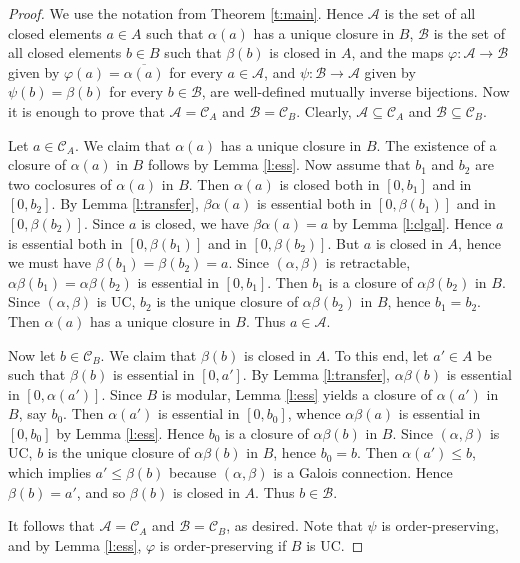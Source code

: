 \documentclass[11pt,a4paper]{amsart}
\begin{document}
\begin{proof} We use the notation from Theorem \ref{t:main}. Hence $\mathcal{A}$ is the set of all closed elements $a\in
A$ such that $\alpha(a)$ has a unique closure in $B$, $\mathcal{B}$ is the set of all closed elements $b\in B$ such that
$\beta(b)$ is closed in $A$, and the maps $\varphi:\mathcal{A}\to \mathcal{B}$ given by
$\varphi(a)=\overline{\alpha(a)}$ for every $a\in \mathcal{A}$, and $\psi:\mathcal{B}\to \mathcal{A}$ given by
$\psi(b)=\beta(b)$ for every $b\in \mathcal{B}$, are well-defined mutually inverse bijections.
Now it is enough to prove that $\mathcal{A}=\mathcal{C}_A$ and $\mathcal{B}=\mathcal{C}_B$. Clearly,
$\mathcal{A}\subseteq \mathcal{C}_A$ and $\mathcal{B}\subseteq \mathcal{C}_B$.  

Let $a\in \mathcal{C}_A$. We claim that $\alpha(a)$ has a unique closure in $B$. The existence of a closure of
$\alpha(a)$ in $B$ follows by Lemma \ref{l:ess}. Now assume that $b_1$ and $b_2$ are two coclosures of
$\alpha(a)$ in $B$. Then $\alpha(a)$ is closed both in $[0,b_1]$ and in $[0,b_2]$. By Lemma \ref{l:transfer},
$\beta\alpha(a)$ is essential both in $[0,\beta(b_1)]$ and in $[0,\beta(b_2)]$. Since $a$ is closed, we have
$\beta\alpha(a)=a$ by Lemma
\ref{l:clgal}. Hence $a$ is essential both in $[0,\beta(b_1)]$ and in $[0,\beta(b_2)]$. But $a$ is closed in $A$,
hence we must have $\beta(b_1)=\beta(b_2)=a$. Since $(\alpha,\beta)$ is retractable, $\alpha\beta(b_1)=\alpha\beta(b_2)$
is essential in $[0,b_1]$. Then $b_1$ is a closure of $\alpha\beta(b_2)$ in $B$.
Since $(\alpha,\beta)$ is UC, $b_2$ is the unique closure of $\alpha\beta(b_2)$ in $B$, hence $b_1=b_2$. Then
$\alpha(a)$ has a unique closure in $B$. Thus $a\in \mathcal{A}$. 

Now let $b\in \mathcal{C}_B$. We claim that $\beta(b)$ is closed in $A$. To this end, let $a'\in A$ be such that
$\beta(b)$ is essential in $[0,a']$. By Lemma \ref{l:transfer}, $\alpha\beta(b)$ is essential in $[0,\alpha(a')]$.
Since $B$ is modular, Lemma \ref{l:ess} yields a closure of $\alpha(a')$ in $B$, say $b_0$. Then
$\alpha(a')$ is essential in $[0,b_0]$, whence $\alpha\beta(a)$ is essential in $[0,b_0]$ by Lemma \ref{l:ess}.
Hence $b_0$ is a closure of $\alpha\beta(b)$ in $B$. Since $(\alpha,\beta)$ is UC, $b$ is the unique
closure of $\alpha\beta(b)$ in $B$, hence $b_0=b$. Then $\alpha(a')\leq b$, which implies $a'\leq \beta(b)$ because
$(\alpha,\beta)$ is a Galois connection. Hence $\beta(b)=a'$, and so $\beta(b)$ is closed in $A$. Thus $b\in
\mathcal{B}$.

It follows that $\mathcal{A}=\mathcal{C}_A$ and $\mathcal{B}=\mathcal{C}_B$, as desired. Note that $\psi$ is
order-preserving, and by Lemma \ref{l:ess}, $\varphi$ is order-preserving if $B$ is UC.
\end{proof}
\end{document}

